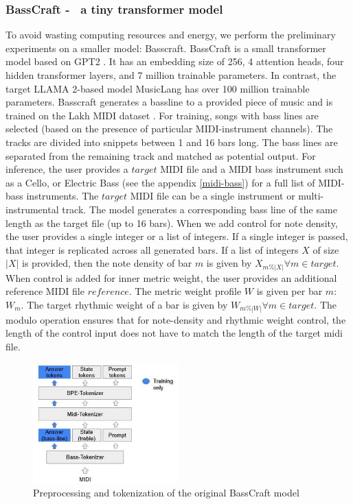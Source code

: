 \subsubsection{BassCraft -  a tiny transformer model}
To avoid wasting computing resources and energy, we perform the preliminary experiments on a smaller model: Basscraft. BassCraft is a small transformer model based on GPT2 \cite{Radford_Wu_Child_Luan_gpt2_2019}. It has an embedding size of 256, 4 attention heads, four hidden transformer layers, and 7 million trainable parameters. In contrast, the target LLAMA 2-based model MusicLang has over 100 million trainable parameters. Basscraft generates a bassline to a provided piece of music and is trained on the Lakh MIDI dataset \cite{Raffel_2016}. For training, songs with bass lines are selected (based on the presence of particular MIDI-instrument channels). The tracks are divided into snippets between 1 and 16 bars long. The bass lines are separated from the remaining track and matched as potential output. 
For inference, the user provides a $target$ MIDI file and a MIDI bass instrument such as a Cello, or Electric Bass (see the appendix \ref{midi-bass}) for a full list of MIDI-bass instruments. The $target$ MIDI file can be a single instrument or multi-instrumental track. The model generates a corresponding bass line of the same length as the target file (up to 16 bars). When we add control for note density, the user provides a single integer or a list of integers. If a single integer is passed, that integer is replicated across all generated bars. If a list of integers $X$ of size $|X|$ is provided, then the note density of bar $m$ is given by $X_{m\%|X|} \forall m \in target$.
When control is added for inner metric weight, the user provides an additional reference MIDI file $reference$. The metric weight profile $W$ is given per bar $m$: $W_{m}$. The target rhythmic weight of a bar is given by $W_{m\%|W|} \forall m \in target$. The modulo operation ensures that for note-density and rhythmic weight control, the length of the control input does not have to match the length of the target midi file.    

\begin{figure}[H]
\centering
\includegraphics[width=0.5\textwidth]{IMAGES/Preprocessing1.jpg} 
\caption{Preprocessing and tokenization of the original BassCraft model}
\label{fig:preprocessing1}
\end{figure}

